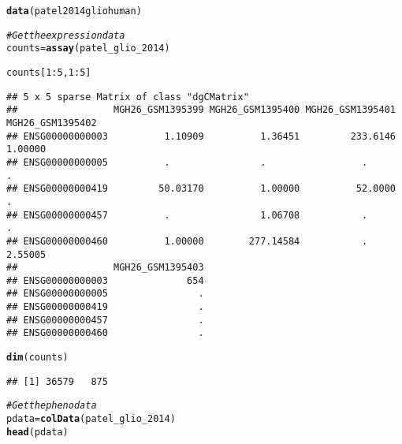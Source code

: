 \documentclass{article}\usepackage[]{graphicx}\usepackage[usenames,dvipsnames]{color}
\makeatletter
\newcommand{\hlnum}[1]{\textcolor[rgb]{0.686,0.059,0.569}{#1}}%
\newcommand{\hlcom}[1]{\textcolor[rgb]{0.678,0.584,0.686}{\textit{#1}}}%
\newcommand{\hlopt}[1]{\textcolor[rgb]{0,0,0}{#1}}%
\newcommand{\hlstd}[1]{\textcolor[rgb]{0.345,0.345,0.345}{#1}}%
\newcommand{\hlkwb}[1]{\textcolor[rgb]{0.69,0.353,0.396}{#1}}%
\newcommand{\hlkwd}[1]{\textcolor[rgb]{0.737,0.353,0.396}{\textbf{#1}}}%
\newenvironment{kframe}{%
 \def\at@end@of@kframe{}%
 \ifinner\ifhmode%
  \def\at@end@of@kframe{\end{minipage}}%
  \begin{minipage}{\columnwidth}%
 \fi\fi%
 \def\FrameCommand##1{\hskip\@totalleftmargin \hskip-\fboxsep
 \colorbox{shadecolor}{##1}\hskip-\fboxsep
     \hskip-\linewidth \hskip-\@totalleftmargin \hskip\columnwidth}%
 \MakeFramed {\advance\hsize-\width
   \@totalleftmargin\z@ \linewidth\hsize
   \@setminipage}}%
 {\par\unskip\endMakeFramed%
 \at@end@of@kframe}
\newenvironment{knitrout}{}{} %
\makeatother
\begin{document}
\begin{knitrout}
\color{fgcolor}\begin{kframe}
\begin{alltt}
\hlkwd{data}\hlstd{(patel2014gliohuman)}

\hlcom{# Get the expression data}
\hlstd{counts} \hlkwb{=} \hlkwd{assay}\hlstd{(patel_glio_2014)}
\end{alltt}


{\ttfamily\noindent\itshape\color{messagecolor}{\#\# Loading required package: Matrix}}

{\ttfamily\noindent\itshape\color{messagecolor}{\#\# \\\#\# Attaching package: 'Matrix'}}

{\ttfamily\noindent\itshape\color{messagecolor}{\#\# The following object is masked from 'package:S4Vectors':\\\#\# \\\#\#\ \ \ \  expand}}\begin{alltt}
\hlstd{counts[}\hlnum{1}\hlopt{:}\hlnum{5}\hlstd{,} \hlnum{1}\hlopt{:}\hlnum{5}\hlstd{]}
\end{alltt}
\begin{verbatim}
## 5 x 5 sparse Matrix of class "dgCMatrix"
##                 MGH26_GSM1395399 MGH26_GSM1395400 MGH26_GSM1395401 MGH26_GSM1395402
## ENSG00000000003          1.10909          1.36451         233.6146          1.00000
## ENSG00000000005          .                .                 .               .      
## ENSG00000000419         50.03170          1.00000          52.0000          .      
## ENSG00000000457          .                1.06708           .               .      
## ENSG00000000460          1.00000        277.14584           .               2.55005
##                 MGH26_GSM1395403
## ENSG00000000003              654
## ENSG00000000005                .
## ENSG00000000419                .
## ENSG00000000457                .
## ENSG00000000460                .
\end{verbatim}
\begin{alltt}
\hlkwd{dim}\hlstd{(counts)}
\end{alltt}
\begin{verbatim}
## [1] 36579   875
\end{verbatim}
\begin{alltt}
\hlcom{# Get the pheno data}
\hlstd{pdata} \hlkwb{=} \hlkwd{colData}\hlstd{(patel_glio_2014)}
\hlkwd{head}\hlstd{(pdata)}
\end{alltt}

\end{kframe}
\end{knitrout}
\end{document}
